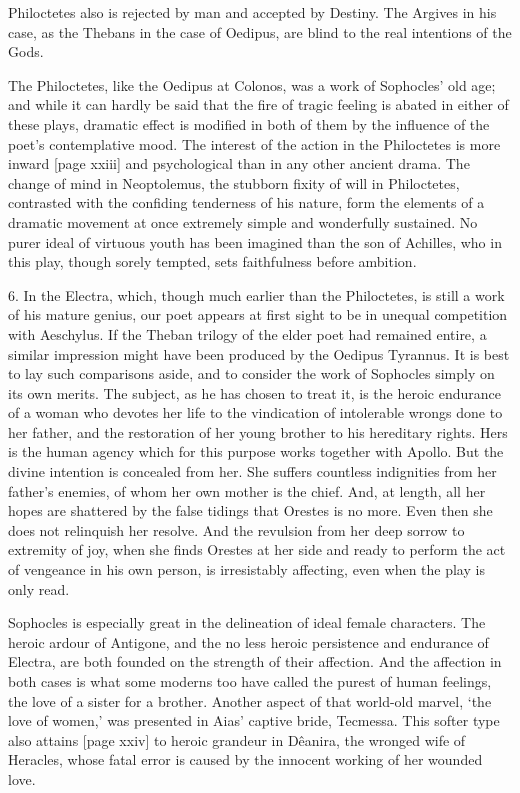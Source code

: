 \documentclass[11pt,letter]{book}
\begin{document}
\par  Philoctetes also is rejected by man and accepted by Destiny. The Argives in his case, as the Thebans in the case of Oedipus, are blind to the real intentions of the Gods.

\par  The Philoctetes, like the Oedipus at Colonos, was a work of Sophocles’ old age; and while it can hardly be said that the fire of tragic feeling is abated in either of these plays, dramatic effect is modified in both of them by the influence of the poet’s contemplative mood. The interest of the action in the Philoctetes is more inward [page xxiii] and psychological than in any other ancient drama. The change of mind in Neoptolemus, the stubborn fixity of will in Philoctetes, contrasted with the confiding tenderness of his nature, form the elements of a dramatic movement at once extremely simple and wonderfully sustained. No purer ideal of virtuous youth has been imagined than the son of Achilles, who in this play, though sorely tempted, sets faithfulness before ambition.

\par  6. In the Electra, which, though much earlier than the Philoctetes, is still a work of his mature genius, our poet appears at first sight to be in unequal competition with Aeschylus. If the Theban trilogy of the elder poet had remained entire, a similar impression might have been produced by the Oedipus Tyrannus. It is best to lay such comparisons aside, and to consider the work of Sophocles simply on its own merits. The subject, as he has chosen to treat it, is the heroic endurance of a woman who devotes her life to the vindication of intolerable wrongs done to her father, and the restoration of her young brother to his hereditary rights. Hers is the human agency which for this purpose works together with Apollo. But the divine intention is concealed from her. She suffers countless indignities from her father’s enemies, of whom her own mother is the chief. And, at length, all her hopes are shattered by the false tidings that Orestes is no more. Even then she does not relinquish her resolve. And the revulsion from her deep sorrow to extremity of joy, when she finds Orestes at her side and ready to perform the act of vengeance in his own person, is irresistably affecting, even when the play is only read.

\par  Sophocles is especially great in the delineation of ideal female characters. The heroic ardour of Antigone, and the no less heroic persistence and endurance of Electra, are both founded on the strength of their affection. And the affection in both cases is what some moderns too have called the purest of human feelings, the love of a sister for a brother. Another aspect of that world-old marvel, ‘the love of women,’ was presented in Aias’ captive bride, Tecmessa. This softer type also attains [page xxiv] to heroic grandeur in Dêanira, the wronged wife of Heracles, whose fatal error is caused by the innocent working of her wounded love.
\end{document}
